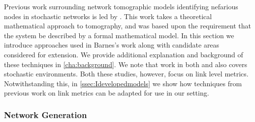 Previous work surrounding network tomographic models identifying nefarious nodes in stochastic networks is led by \cite{barnes_stochastic_2020}. This work takes a theoretical mathematical approach to tomography, and was based upon the requirement that the system be described by a formal mathematical model. In this section we introduce approaches used in Barnes's work along with candidate areas considered for extension. We provide additional explanation and background of these techniques in \cref{cha:background}. We note that work in both \cite{he_fisher_2015} and \cite{kolar_distributed_2020} also covers stochastic environments. Both these studies, however, focus on link level metrics. Notwithstanding this, in  \cref{ssec:Idevelopedmodels} we show how techniques from previous work on link metrics can be adapted for use in our setting.

\subsubsection*{Network Generation}
\label{sssec:Inetworkgeneration}


